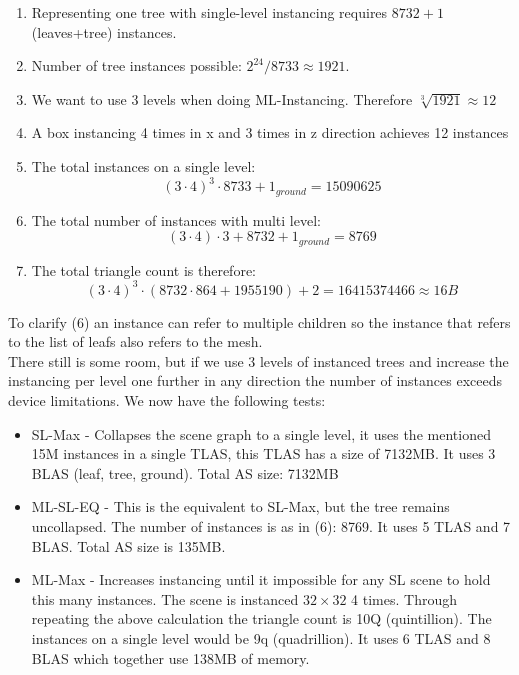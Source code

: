 \begin{enumerate}
    \item Representing one tree with single-level instancing requires $8732+1$ (leaves+tree) instances.
    \item Number of tree instances possible: $2^{24}/8733 \approx 1921$.
    \item We want to use 3 levels when doing ML-Instancing. Therefore $\sqrt[3]{1921} \approx 12$
    \item A box instancing 4 times in x and 3 times in z direction achieves 12 instances
    \item The total instances on a single level:
    \[(3\cdot4)^3 \cdot 8733 + 1_{ground} = 15090625\]
    \item The total number of instances with multi level:
    \[(3\cdot4)\cdot3 + 8732 + 1_{ground} = 8769\]
    \item The total triangle count is therefore:
    \[(3\cdot4)^3 \cdot (8732 \cdot 864 + 1955190) + 2 = 16415374466 \approx 16B\]
\end{enumerate}
To clarify (6) an instance can refer to multiple children so the instance that refers to the list of leafs also refers to the mesh.\\
There still is some room, but if we use 3 levels of instanced trees and increase the instancing per level one further in any direction the number of instances exceeds device limitations. We now have the following tests:
\begin{itemize}
    \item SL-Max - Collapses the scene graph to a single level, it uses the mentioned 15M instances in a single TLAS, this TLAS has a size of 7132MB. It uses 3 BLAS (leaf, tree, ground). Total AS size: 7132MB
    \item ML-SL-EQ - This is the equivalent to SL-Max, but the tree remains uncollapsed. The number of instances is as in (6): 8769. It uses 5 TLAS and 7 BLAS. Total AS size is 135MB. 
    \item ML-Max - Increases instancing until it impossible for any SL scene to hold this many instances. The scene is instanced $32\times32$ 4 times. Through repeating the above calculation the triangle count is 10Q (quintillion). The instances on a single level would be 9q (quadrillion). It uses 6 TLAS and 8 BLAS which together use 138MB of memory.
\end{itemize}
